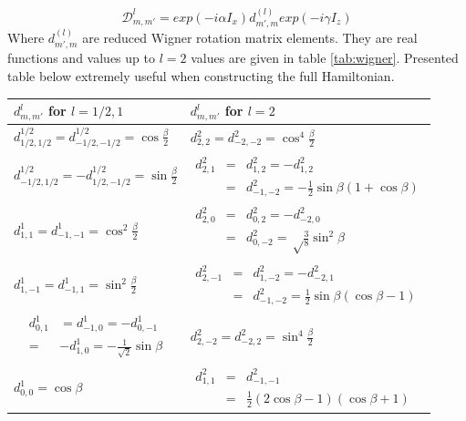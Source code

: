 \begin{equation}\label{eq:45}
\mathcal{D}_{m,m'}^l=exp(-i\alpha I_x)d_{m',m}^{(l)}exp(-i\gamma I_z)
\end{equation}
Where $d_{m',m}^{(l)}$ are reduced Wigner rotation matrix elements. They are real functions and values up to $l=2$ values are given in table \ref{tab:wigner}. Presented table below extremely useful when constructing the full Hamiltonian. 
\begin{table}
\begin{center}
    \begin{tabular}{  l | l }
    \hline
    $d^{l}_{m,m'}$ for $l=1/2,1$ & $d^{l}_{m,m'}$ for $l=2$ \\ \hline
    $d^{1/2}_{1/2,1/2}=d^{1/2}_{-1/2,-1/2}=\cos\frac{\beta}{2}$ & $d^{2}_{2,2}=d^{2}_{-2,-2}=\cos^4\frac{\beta}{2}$ \\
    $d^{1/2}_{-1/2,1/2}=-d^{1/2}_{1/2,-1/2}=\sin\frac{\beta}{2}$ & $\begin{array} {lcl} d^{2}_{2,1} & = & d^{2}_{1,2}=-d^{2}_{1,2} \\ & = & d^{2}_{-1,-2}=-\frac{1}{2}\sin\beta(1+\cos\beta) \end{array}$  \\ 
    $d^{1}_{1,1}=d^{1}_{-1,-1}=\cos^2\frac{\beta}{2}$ & $\begin{array} {lcl} d^{2}_{2,0} & = & d^{2}_{0,2}=-d^{2}_{-2,0} \\ & = & d^{2}_{0,-2}=\sqrt\frac{3}{8}\sin^2\beta \end{array}$ \\ 
    $d^{1}_{1,-1}=d^{1}_{-1,1}=\sin^2\frac{\beta}{2}$ & $\begin{array} {lcl} d^{2}_{2,-1} & = & d^{2}_{1,-2}=-d^{2}_{-2,1} \\ & = & d^{2}_{-1,-2}=\frac{1}{2}\sin\beta(\cos\beta-1) \end{array}$ \\ 
   $\begin{array} {lcl} &d^{1}_{0,1}& =  d^{1}_{-1,0}=-d^{1}_{0,-1}\\ & = & -d^{1}_{1,0}=-\frac{1}{\sqrt{2}}\sin\beta \end{array}$ & $d^{2}_{2,-2}=d^{2}_{-2,2}=\sin^4\frac{\beta}{2}$ \\ 
    $d^{1}_{0,0}=\cos\beta$  & $\begin{array} {lcl} d^{2}_{1,1} & = & d^{2}_{-1,-1} \\ & = & \frac{1}{2}(2\cos\beta-1)(\cos\beta+1) \end{array}$\\ 

\end{tabular}
\end{center}
\end{table}
